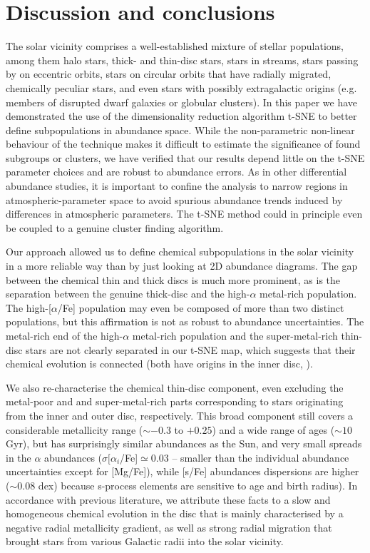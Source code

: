 \documentclass{aa}  %
\begin{document}
\section{Discussion and conclusions}\label{conclusions}

The solar vicinity comprises a well-established mixture of stellar populations, among them halo stars, thick- and thin-disc stars, stars in streams, stars passing by on eccentric orbits, stars on circular orbits that have radially migrated, chemically peculiar stars, and even stars with possibly extragalactic origins (e.g. members of disrupted dwarf galaxies or globular clusters). 
In this paper we have demonstrated the use of the dimensionality reduction algorithm t-SNE to better define subpopulations in abundance space. While the non-parametric non-linear behaviour of the technique makes it difficult to estimate the significance of found subgroups or clusters, we have verified that our results depend little on the t-SNE parameter choices and are robust to abundance errors. As in other differential abundance studies, it is important to confine the analysis to narrow regions in atmospheric-parameter space to avoid spurious abundance trends induced by differences in atmospheric parameters. The t-SNE method could in principle even be coupled to a genuine cluster finding algorithm. 

Our approach allowed us to define chemical subpopulations in the solar vicinity in a more reliable way than by just looking at 2D abundance diagrams. The gap between the chemical thin and thick discs is much more prominent, as is the separation between the genuine thick-disc and the high-$\alpha$ metal-rich population. The high-[$\alpha$/Fe] population may even be composed of more than two distinct populations, but this affirmation is not as robust to abundance uncertainties. The metal-rich end of the high-$\alpha$ metal-rich population and the super-metal-rich thin-disc stars are not clearly separated in our t-SNE map, which suggests that their chemical evolution is connected (both have origins in the inner disc, \citealt[][see also Chiappini et al., in prep.]{Adibekyan2012, Haywood2018}). 

We also re-characterise the chemical thin-disc component, even excluding the metal-poor and and super-metal-rich parts corresponding to stars originating from the inner and outer disc, respectively. This broad component still covers a considerable metallicity range ($\sim-0.3$ to $+0.25$) and a wide range of ages ($\sim10$ Gyr), but has surprisingly similar abundances as the Sun, and very small spreads in the $\alpha$ abundances ($\sigma[\alpha_i$/Fe]$\simeq0.03$ -- smaller than the individual abundance uncertainties except for [Mg/Fe]), while [s/Fe] abundances dispersions are higher ($\sim0.08$ dex) because s-process elements are sensitive to age and birth radius). In accordance with previous literature, we attribute these facts to a slow and homogeneous chemical evolution in the disc that is mainly characterised by a negative radial metallicity gradient, as well as strong radial migration that brought stars from various Galactic radii into the solar vicinity.
\end{document}
